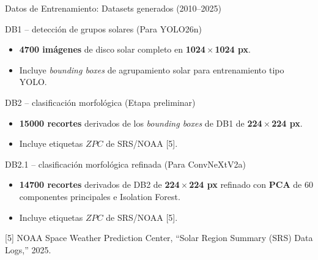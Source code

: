 \documentclass[aspectratio=169]{beamer}
\begin{document}
\begin{frame}{Datos de Entrenamiento: Datasets generados (2010--2025) \quad \setlength{\fboxrule}{1.2pt}\setlength{\fboxsep}{3pt}}
    \footnotesize
    \begin{block}{DB1 -- detección de grupos solares (Para YOLO26n)}
      \begin{itemize}
            \item \textbf{4700 im\'agenes} de disco solar completo en \textbf{1024\,$\times$\,1024 px}.
            \item Incluye \textit{bounding boxes} de agrupamiento solar para entrenamiento tipo YOLO.
      \end{itemize}
    \end{block}

    \begin{block}{DB2 -- clasificación morfológica (Etapa preliminar)}
        \begin{itemize}
            \item \textbf{15000 recortes} derivados de los \textit{bounding boxes} de DB1 de \textbf{224\,$\times$\,224 px}.
            \item Incluye etiquetas $ZPC$ de SRS/NOAA [5].
        \end{itemize}
    \end{block}

    \begin{block}{DB2.1 -- clasificación morfológica refinada (Para ConvNeXtV2a)}
        \begin{itemize}
            \item \textbf{14700 recortes} derivados de DB2 de \textbf{224\,$\times$\,224 px} refinado con \textbf{PCA} de 60 componentes principales e Isolation Forest.
            \item Incluye etiquetas $ZPC$ de SRS/NOAA [5].
        \end{itemize}
    \end{block}
    
    \vfill
    {\raggedright\tiny\color{gray} [5] NOAA Space Weather Prediction Center, “Solar Region Summary (SRS) Data Logs,” 2025.\par}
\end{frame}


    
\end{document}
